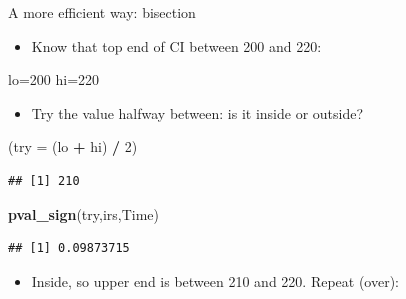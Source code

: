 \documentclass[ignorenonframetext,]{beamer}
\newenvironment{Shaded}{\begin{snugshade}}{\end{snugshade}}
\newcommand{\DataTypeTok}[1]{\textcolor[rgb]{0.13,0.29,0.53}{#1}}
\newcommand{\DecValTok}[1]{\textcolor[rgb]{0.00,0.00,0.81}{#1}}
\newcommand{\KeywordTok}[1]{\textcolor[rgb]{0.13,0.29,0.53}{\textbf{#1}}}
\newcommand{\NormalTok}[1]{#1}
\newcommand{\OperatorTok}[1]{\textcolor[rgb]{0.81,0.36,0.00}{\textbf{#1}}}
\newcommand{\StringTok}[1]{\textcolor[rgb]{0.31,0.60,0.02}{#1}}
\providecommand{\tightlist}{%
  \setlength{\itemsep}{0pt}\setlength{\parskip}{0pt}}
\begin{document}
\begin{frame}[fragile]{A more efficient way: bisection}
\protect\hypertarget{a-more-efficient-way-bisection}{}

\begin{itemize}
\tightlist
\item
  Know that top end of CI between 200 and 220:
\end{itemize}

\begin{Shaded}
\begin{Highlighting}[]
\NormalTok{lo=}\DecValTok{200} 
\NormalTok{hi=}\DecValTok{220}
\end{Highlighting}
\end{Shaded}

\begin{itemize}
\tightlist
\item
  Try the value halfway between: is it inside or outside?
\end{itemize}

\begin{Shaded}
\begin{Highlighting}[]
\NormalTok{(}\DataTypeTok{try =}\NormalTok{ (lo }\OperatorTok{+}\StringTok{ }\NormalTok{hi) }\OperatorTok{/}\StringTok{ }\DecValTok{2}\NormalTok{)}
\end{Highlighting}
\end{Shaded}

\begin{verbatim}
## [1] 210
\end{verbatim}

\begin{Shaded}
\begin{Highlighting}[]
\KeywordTok{pval_sign}\NormalTok{(try,irs,Time)}
\end{Highlighting}
\end{Shaded}

\begin{verbatim}
## [1] 0.09873715
\end{verbatim}

\begin{itemize}
\tightlist
\item
  Inside, so upper end is between 210 and 220. Repeat (over):
\end{itemize}

\end{frame}
\end{document}
